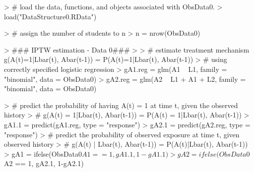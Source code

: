 \documentclass[answers]{exam}
\begin{document}
\begin{enumerate}
\begin{solution}
\begin{Schunk}
\begin{Sinput}
> # load the data, functions, and objects associated with ObsData0.
> load("DataStructure0.RData")
\end{Sinput}
\end{Schunk}
\begin{Schunk}
\begin{Sinput}
> # assign the number of students to n
> n = nrow(ObsData0)
\end{Sinput}
\end{Schunk}
\begin{Schunk}
\begin{Sinput}
> ### IPTW estimation - Data 0###
> 
> # estimate treatment mechanism g(A(t)=1|Lbar(t), Abar(t-1)) = P(A(t)=1|Lbar(t), Abar(t-1))
> # using correctly specified logistic regression
> gA1.reg = glm(A1 ~ L1, family = "binomial", data = ObsData0)
> gA2.reg = glm(A2 ~ L1 + A1 +  L2, family = "binomial", data = ObsData0)
\end{Sinput}
\end{Schunk}
\begin{Schunk}
\begin{Sinput}
> # predict the probability of having A(t) = 1 at time t, given the observed history
> # g(A(t) = 1|Lbar(t), Abar(t-1)) = P(A(t) = 1|Lbar(t), Abar(t-1))
> gA1.1 = predict(gA1.reg, type = "response")
> gA2.1 = predict(gA2.reg, type = "response")
> # predict the probability of observed exposure at time t, given observed history
> # g(A(t) | Lbar(t), Abar(t-1)) = P(A(t)|Lbar(t), Abar(t-1))
> gA1 = ifelse(ObsData0$A1 == 1, gA1.1, 1-gA1.1)
> gA2 = ifelse(ObsData0$A2 == 1, gA2.1, 1-gA2.1)
\end{Sinput}
\end{Schunk}


\end{solution}
\end{enumerate}
\end{document}
